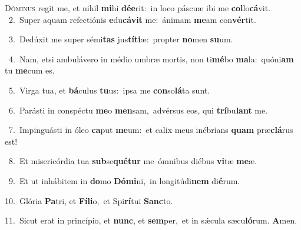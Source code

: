 \lettrine{\initial\textcolor{\initialcolor}{D}}{óminus} regit me, et nihil \textbf{mi}\-hi \textbf{dé}\-\textbf{e}rit:~\star in loco páscuæ ibi me \textbf{col}\-lo\-\textbf{cá}\-vit.\\
{\numbfont\textcolor{\numbcolor}{~2.}}~Super aquam refectiónis \textbf{e}\-du\-\textbf{cá}\-\textbf{vit} me:~\star ánimam \textbf{me}\-am con\-\textbf{vér}\-tit.\par
{\numbfont\textcolor{\numbcolor}{~3.}}~Dedúxit me super sémi\textbf{tas} jus\-\textbf{tí}\-\textbf{ti}æ:~\star propter \textbf{no}\-men \textbf{su}\-um.\par
{\numbfont\textcolor{\numbcolor}{~4.}}~Nam, etsi ambulávero in médio umbræ mortis, non ti\-\textbf{mé}\-bo \textbf{ma}\-la:~\star quóni\textbf{am} tu \textbf{me}\-cum es.\par
{\numbfont\textcolor{\numbcolor}{~5.}}~Virga tua, et \textbf{bá}\-culus \textbf{tu}\-us:~\star ipsa me \textbf{con}\-so\-\textbf{lá}\-ta sunt.\par
{\numbfont\textcolor{\numbcolor}{~6.}}~Parásti in conspéctu \textbf{me}\-o \textbf{men}\-sam,~\star advérsus eos, qui \textbf{trí}\-bu\textbf{lant} me.\par
{\numbfont\textcolor{\numbcolor}{~7.}}~Impinguásti in óleo \textbf{ca}\-put \textbf{me}\-um:~\star et calix meus inébrians \textbf{quam} præ\-\textbf{clá}\-rus est!\par
{\numbfont\textcolor{\numbcolor}{~8.}}~Et misericórdia tua \textbf{sub}\-se\-\textbf{qué}\-\textbf{tur} me~\star ómnibus diébus \textbf{vi}\-tæ \textbf{me}\-æ.\par
{\numbfont\textcolor{\numbcolor}{~9.}}~Et ut inhábitem in \textbf{do}\-mo \textbf{Dó}\-\textbf{mi}ni,~\star in longitúdi\textbf{nem} di\-\textbf{é}\-rum.\par
{\numbfont\textcolor{\numbcolor}{10.}}~Glória \textbf{Pa}\-tri, et \textbf{Fí}\-\textbf{li}o,~\star et Spi\-\textbf{rí}\-tui \textbf{Sanc}\-to.\par
{\numbfont\textcolor{\numbcolor}{11.}}~Sicut erat in princípio, et \textbf{nunc}\-, et \textbf{sem}\-per,~\star et in sǽcula sæcu\-\textbf{ló}\-rum. \textbf{A}\-men.\par
